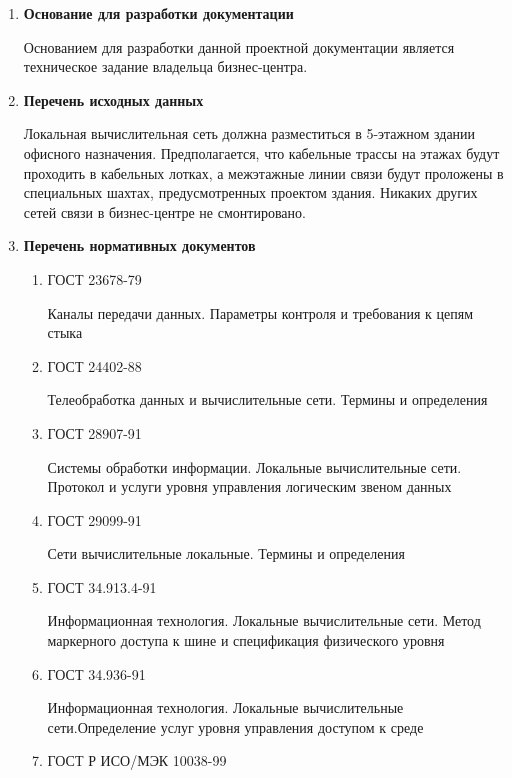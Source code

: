 \documentclass[a4paper,14pt]{extarticle}
\begin{document}
    \begin{enumerate}
        \item \textbf{Основание для разработки документации}\par
        Основанием для разработки данной проектной документации является \linebreak 
        техническое задание владельца бизнес-центра.
        \item \textbf{Перечень исходных данных}\par
        Локальная вычислительная сеть должна разместиться в 5-этажном здании \linebreak офисного назначения. Предполагается, что 
        кабельные трассы на этажах будут проходить в кабельных лотках, а межэтажные линии связи будут проложены в специальных 
        шахтах, предусмотренных проектом здания. Никаких других сетей связи в бизнес-центре не смонтировано.
        \item \textbf{Перечень нормативных документов}\par
        \begin{enumerate}
            \item ГОСТ 23678-79\par
            Каналы передачи данных. Параметры контроля и требования к цепям стыка
            \item ГОСТ 24402-88\par
            Телеобработка данных и вычислительные сети. Термины и определения
            \item ГОСТ 28907-91\par
            Системы обработки информации. Локальные вычислительные сети. \linebreak Протокол и услуги уровня управления логическим звеном данных
            \item ГОСТ 29099-91\par
            Сети вычислительные локальные. Термины и определения
            \item ГОСТ 34.913.4-91\par
            Информационная технология. Локальные вычислительные сети. Метод маркерного доступа к шине и спецификация физического уровня
            \item ГОСТ 34.936-91\par
            Информационная технология. Локальные вычислительные сети.\linebreak Определение услуг уровня управления доступом к среде
            \item ГОСТ Р ИСО/МЭК 10038-99\par

\end{enumerate}
\end{enumerate}
\end{document}

